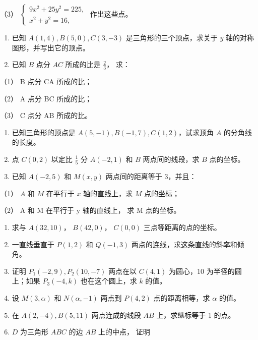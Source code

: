 （3）
\(\left\{ \begin{array}{l} 9x^{2} + 25y^{2} = 225, \\ x^{2} + y^{2} = 16, \end{array} \right.\)
作出这些点。

\begin{enumerate}
\def\labelenumi{\arabic{enumi}.}
\setcounter{enumi}{1}
\item
  已知 \(A(1, 4), B(5, 0), C(3, -3)\) 是三角形的三个顶点，求关于 \(y\)
  轴的对称图形，并写出它的顶点。
\item
  已知 \(B\) 点分 \(AC\) 所成的比是 \(\frac{2}{3}\)， 求：
\end{enumerate}

（1） B 点分 CA 所成的比；

（2） A 点分 BC 所成的比；

（3） C 点分 AB 所成的比。

\begin{enumerate}
\def\labelenumi{\arabic{enumi}.}
\setcounter{enumi}{3}
\item
  已知三角形的顶点是 \(A(5, -1), B(-1, 7), C(1, 2)\)，试求顶角 \(A\)
  的分角线的长度。
\item
  点 \(C(0, 2)\) 以定比 \(\frac{1}{5}\) 分 \(A(-2, 1)\) 和 \(B\)
  两点间的线段，求 \(B\) 点的坐标。
\item
  已知 \(A(-2, 5)\) 和 \(M(x, y)\) 两点间的距离等于 3，并且：
\end{enumerate}

（1） \(A\) 和 \(M\) 在平行于 \(x\) 轴的直线上，求 \(M\) 点的坐标；

（2） A 和 M 在平行于 y 轴的直线上， 求 M 点的坐标。

\begin{enumerate}
\def\labelenumi{\arabic{enumi}.}
\setcounter{enumi}{6}
\item
  求与 \(A(32, 10)\)， \(B(42, 0)\)， \(C(0, 0)\) 三点等距离的点的坐标。
\item
  一直线垂直于 \(P(1,2)\) 和 \(Q(-1,3)\)
  两点的连线，求这条直线的斜率和倾角。
\item
  证明 \(P_{1}(-2, 9), P_{2}(10, -7)\) 两点在以 \(C(4, 1)\) 为圆心，10
  为半径的圆上；如果 \(P_{3}(-4, k)\) 也在这个圆上，求 \(k\) 的值。
\item
  设 \(M(3, \alpha)\) 和 \(N(\alpha, -1)\) 两点到 \(P(4, 2)\)
  点的距离相等，求 \(\alpha\) 的值。
\item
  在 \(A(2, -4), B(5, 11)\) 两点连成的线段 \(AB\) 上，求纵标等于 1
  的点。
\item
  \(D\) 为三角形 \(ABC\) 的边 \(AB\) 上的中点， 证明
\end{enumerate}

